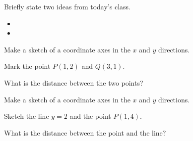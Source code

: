 \begin{problem}
\item Briefly state two ideas from today's class.
  \begin{itemize}
  \item
  \item
  \end{itemize}
\item
  \begin{subproblem}
    \item
  \end{subproblem}
\end{problem}


\begin{problem}
\item Make a sketch of a coordinate axes in the $x$ and $y$ directions.
  \vfill
\begin{subproblem}
  \item Mark the point $P(1,2)$ and $Q(3,1)$.
  \item What is the distance between the two points?
    \vspace{3em}
\end{subproblem}

\item Make a sketch of a coordinate axes in the $x$ and $y$ directions.
  \vfill
\begin{subproblem}
  \item Sketch the line $y=2$ and the point $P(1,4)$.
  \item What is the distance between the point and the line?
    \vspace{3em}
\end{subproblem}


\end{problem}


